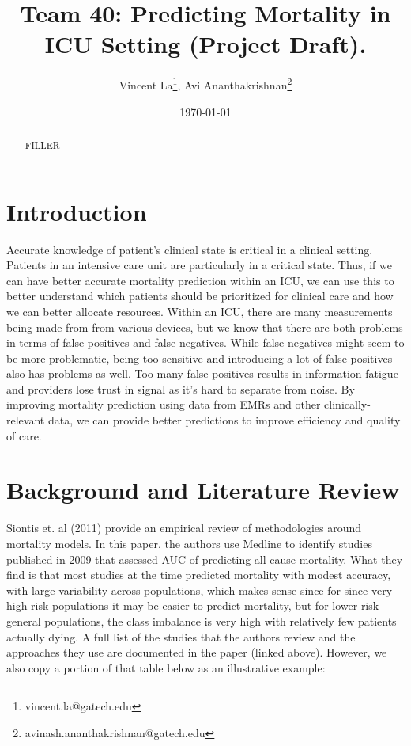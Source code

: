 \documentclass[12pt, final]{article}
\renewcommand{\thefootnote}{$\star$}
\begin{document}
\title{Team 40: Predicting Mortality in ICU Setting (Project Draft).}

\date{\today}

\renewcommand{\thefootnote}{$\dag$}
\author{Vincent La\footnote{vincent.la@gatech.edu}, Avi Ananthakrishnan\footnote{avinash.ananthakrishnan@gatech.edu}}

\maketitle

\begin{abstract}
FILLER
\end{abstract} 

\newpage
\renewcommand{\thefootnote}{\number\value{footnote}} 
\section{Introduction} \label{Introduction}
Accurate knowledge of patient's clinical state is critical in a clinical setting. Patients in an intensive care unit are particularly in a critical state. Thus, if we can have better accurate mortality prediction within an ICU, we can use this to better understand which patients should be prioritized for clinical care and how we can better allocate resources. Within an ICU, there are many measurements being made from from various devices, but we know that there are both problems in terms of false positives and false negatives. While false negatives might seem to be more problematic, being too sensitive and introducing a lot of false positives also has problems as well. Too many false positives results in information fatigue and providers lose trust in signal as it's hard to separate from noise. By improving mortality prediction using data from EMRs and other clinically-relevant data, we can provide better predictions to improve efficiency and quality of care.

\section{Background and Literature Review}
\label{Background and Lit Review}
Siontis et. al (2011) provide an empirical review of methodologies around mortality models. In this paper, the authors use Medline to identify studies published in 2009 that assessed AUC of predicting all cause mortality. What they find is that most studies at the time predicted mortality with modest accuracy, with large variability across populations, which makes sense since for since very high risk populations it may be easier to predict mortality, but for lower risk general populations, the class imbalance is very high with relatively few patients actually dying. A full list of the studies that the authors review and the approaches they use are documented in the paper (linked above). However, we also copy a portion of that table below as an illustrative example:
\end{document}
